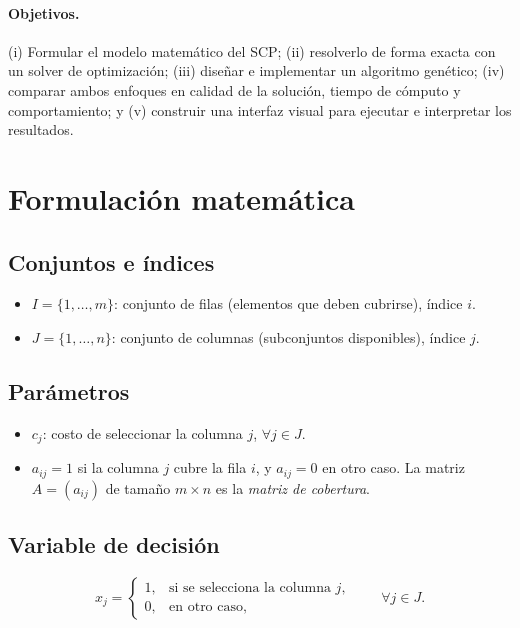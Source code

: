 \documentclass[11pt,a4paper]{article}
\begin{document}
\paragraph{Objetivos.} (i) Formular el modelo matemático del SCP; (ii) resolverlo de forma exacta
con un solver de optimización; (iii) diseñar e implementar un algoritmo genético; (iv) comparar
ambos enfoques en calidad de la solución, tiempo de cómputo y comportamiento; y (v) construir una
interfaz visual para ejecutar e interpretar los resultados.

\section{Formulación matemática}
\subsection*{Conjuntos e índices}
\begin{itemize}[nosep]
  \item $I=\{1,\dots,m\}$: conjunto de filas (elementos que deben cubrirse), índice $i$.
  \item $J=\{1,\dots,n\}$: conjunto de columnas (subconjuntos disponibles), índice $j$.
\end{itemize}

\subsection*{Parámetros}
\begin{itemize}[nosep]
  \item $c_j$: costo de seleccionar la columna $j$, $\forall j\in J$.
  \item $a_{ij}=1$ si la columna $j$ cubre la fila $i$, y $a_{ij}=0$ en otro caso. La matriz
  $A=(a_{ij})$ de tamaño $m\times n$ es la \emph{matriz de cobertura}.
\end{itemize}

\subsection*{Variable de decisión}
\[
x_j=\begin{cases}1,& \text{si se selecciona la columna } j,\\ 0,& \text{en otro caso,}\end{cases}
\qquad \forall j\in J.
\]
\end{document}
